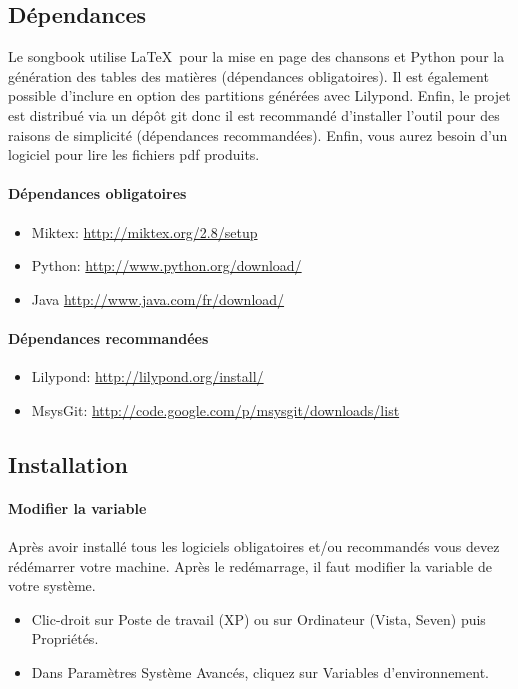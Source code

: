 \documentclass[versionenligne]{patacrep}
\begin{document}
\subsection{Dépendances}
\label{sec:songbook-dep-win}

Le songbook utilise \LaTeX\, pour la mise en page des chansons et
Python pour la génération des tables des matières (dépendances
obligatoires).  Il est également possible d'inclure en option des
partitions générées avec Lilypond. Enfin, le projet est distribué via
un dépôt git donc il est recommandé d'installer l'outil pour des
raisons de simplicité (dépendances recommandées). Enfin, vous aurez
besoin d'un logiciel pour lire les fichiers pdf produits.

\paragraph{Dépendances obligatoires}
\begin{itemize}
\item Miktex: \url{http://miktex.org/2.8/setup}
\item Python: \url{http://www.python.org/download/}
\item Java \url{http://www.java.com/fr/download/}
\end{itemize}

\paragraph{Dépendances recommandées}
\begin{itemize} 
\item Lilypond: \url{http://lilypond.org/install/}
\item MsysGit: \url{http://code.google.com/p/msysgit/downloads/list}
\end{itemize}

\subsection{Installation}
\label{sec:install-win}

\paragraph{Modifier la variable }
Après avoir installé tous les logiciels obligatoires et/ou recommandés
vous devez rédémarrer votre machine.  Après le redémarrage, il faut
modifier la variable  de votre système.
\begin{itemize}
\item Clic-droit sur Poste de travail (XP) ou sur Ordinateur (Vista, Seven) puis Propriétés. 
\item Dans Paramètres Système Avancés, cliquez sur Variables d'environnement. 
\end{itemize}
\end{document}

